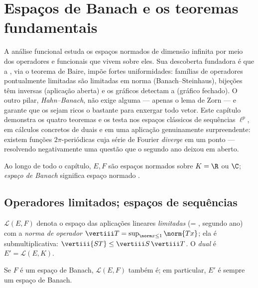 \chapter{Espaços de Banach e os teoremas fundamentais}
\label{ch:b3:banach}

A análise funcional estuda os espaços normados de dimensão infinita por
meio dos operadores e funcionais que vivem sobre eles. Sua descoberta
fundadora é que a \emph{}, via o teorema de Baire, impõe
fortes uniformidades: famílias de operadores pontualmente limitadas são
limitadas em norma (Banach--Steinhaus), bijeções  têm inversas
 (aplicação aberta) e os gráficos detectam a 
(gráfico fechado). O outro pilar, \emph{Hahn--Banach}, não exige
 alguma --- apenas o lema de Zorn --- e garante que os
 sejam ricos o bastante para enxergar todo vetor. Este
capítulo demonstra os quatro teoremas e os testa nos espaços clássicos
de sequências $\ell^p$, em cálculos concretos de duais e em uma
aplicação genuinamente surpreendente: existem funções 
$2\pi$-periódicas cuja série de Fourier \emph{diverge} em um ponto
--- resolvendo negativamente uma questão que o segundo ano deixou em
aberto.

Ao longo de todo o capítulo, $E, F$ são espaços normados sobre
$K = \R$ ou $\C$; \emph{espaço de Banach}
significa espaço normado .

\section{Operadores limitados; espaços de sequências}

\begin{definition}\label{def:b3:banach:operator}
$\mathcal L(E, F)$ denota o espaço das aplicações lineares \emph{limitadas}
(= , segundo ano) com a \emph{norma de operador} $\vertiii T = \sup_{\norm x \leq
1}\norm{Tx}$; ela é submultiplicativa: $\vertiii{ST} \leq
\vertiii S\,\vertiii T$. O
\emph{dual} é $E' = \mathcal L(E, K)$.
\end{definition}

\begin{proposition}\label{prop:b3:banach:llcomplete}
Se $F$ é um espaço de Banach, $\mathcal L(E, F)$ também é; em particular, $E'$ é
sempre um espaço de Banach.
\end{proposition}

